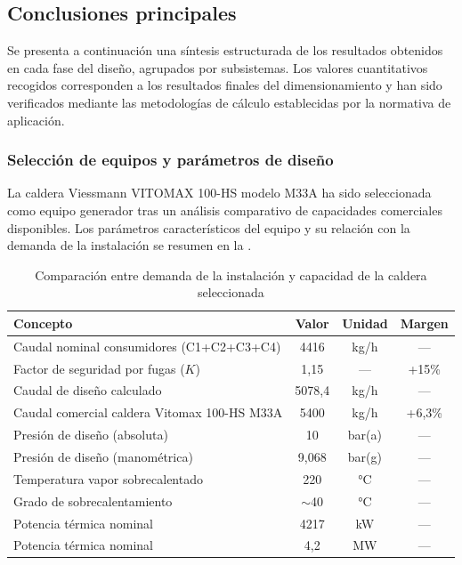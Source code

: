 \subsection{Conclusiones principales}
\label{subsec:conclusiones-principales}

Se presenta a continuación una síntesis estructurada de los resultados obtenidos en cada fase del diseño, agrupados por subsistemas. Los valores cuantitativos recogidos corresponden a los resultados finales del dimensionamiento y han sido verificados mediante las metodologías de cálculo establecidas por la normativa de aplicación.

\subsubsection{Selección de equipos y parámetros de diseño}
\label{subsubsec:conclusiones-equipos}

La caldera Viessmann VITOMAX 100-HS modelo M33A ha sido seleccionada como equipo generador tras un análisis comparativo de capacidades comerciales disponibles. Los parámetros característicos del equipo y su relación con la demanda de la instalación se resumen en la .

\begin{table}[H]
	\centering
	\caption{Comparación entre demanda de la instalación y capacidad de la caldera seleccionada}
	\label{tab:conclusiones-seleccion-caldera}
	\begin{tabular}{lccc}
		\toprule
		\textbf{Concepto}                            & \textbf{Valor} & \textbf{Unidad} & \textbf{Margen} \\
		\midrule
		Caudal nominal consumidores (C1+C2+C3+C4)    & 4416           & kg/h            & ---             \\
		Factor de seguridad por fugas ($K$)          & 1,15           & ---             & +15\%           \\
		Caudal de diseño calculado                   & 5078,4         & kg/h            & ---             \\
		Caudal comercial caldera Vitomax 100-HS M33A & 5400           & kg/h            & +6,3\%          \\
		\midrule
		Presión de diseño (absoluta)                 & 10             & bar(a)          & ---             \\
		Presión de diseño (manométrica)              & 9,068          & bar(g)          & ---             \\
		Temperatura vapor sobrecalentado             & 220            & °C              & ---             \\
		Grado de sobrecalentamiento                  & $\sim$40       & °C              & ---             \\
		\midrule
		Potencia térmica nominal                     & 4217           & kW              & ---             \\
		Potencia térmica nominal                     & 4,2            & MW              & ---             \\
		\bottomrule
	\end{tabular}
\end{table}

